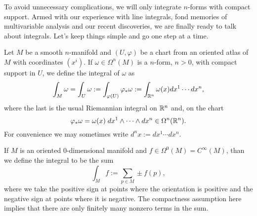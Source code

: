 To avoid unnecessary complications, we will only integrate $n$-forms with compact support.
Armed with our experience with line integrals, fond memories of multivariable analysis and our recent discoveries, we are finally ready to talk about integrals.
Let's keep things simple and go one step at a time.


\begin{definition}\label{def:intnform:chart}
	Let $M$ be a smooth $n$-manifold and $(U,\varphi)$ be a chart from an oriented atlas of $M$ with coordinates $(x^i)$.
	If $\omega\in\Omega^n(M)$ is a $n$-form, $n > 0$, with compact support in $U$, we define the integral of $\omega$ as
	\begin{equation}
		\int_M \omega = \int_U \omega := \int_{\varphi(U)} \varphi_*\omega := \int_{\mathbb{R}^n} \omega(x) d x^1\cdots dx^n,
	\end{equation}
	where the last is the usual Riemannian integral on $\mathbb{R}^n$ and, on the chart
	\begin{equation}
		\varphi_*\omega = \omega(x)\; dx^{1}\wedge \cdots\wedge dx^{n}\in\Omega^n(\mathbb{R}^n).
	\end{equation}
	For convenience we may sometimes write $d^n x := dx^1 \cdots dx^n$.

	If $M$ is an oriented $0$-dimensional manifold and $f\in\Omega^0(M) = C^\infty(M)$, than we define the integral to be the sum
	\begin{equation}
		\int_M f := \sum_{p\in M} \pm f(p),
	\end{equation}
	where we take the positive sign at points where the orientation is positive and the negative sign at points where it is negative.
	The compactness assumption here implies that there are only finitely many nonzero terms in the sum.
\end{definition}

